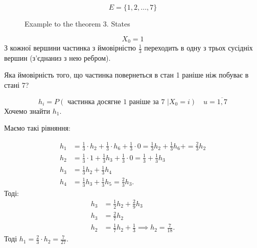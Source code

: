  \begin{example}
   \[ E = \{1,2,\ldots,7\} \] 
\begin{figure}[ht]
    \centering
    \caption{Example to the theorem 3. States}
    \label{fig:example-to-the-theorem-3-states}
\end{figure}
\[ X_0 = 1 \] 
З кожної вершини частинка з ймовірністю $\frac{1}{3}$ переходить в одну з трьох сусідніх вершин
(з'єднаниз з нею ребром).

Яка ймовірність того, що частинка повернеться в стан 1 раніше ніж побуває в стані 7?

\[ h_i = P\left( \text{ частинка досягне 1 раніше за 7 } | X_0 = i \right) \quad u = \overline{1,7} \] 
Хочемо знайти $h_1$.

Маємо такі рівняння:

\begin{align*}
  h_1 &= \frac{1}{3} \cdot h_2 + \frac{1}{3} \cdot  h_6 + \frac{1}{3} \cdot 0 =
  \frac{1}{3}h_2 + \frac{1}{3}h_6 + = \frac{2}{3}h_2 \\
  h_2 &= \frac{1}{3} \cdot 1 + \frac{1}{3}h_3 + \frac{1}{3}\cdot 0 = \frac{1}{3} + \frac{1}{3}h_3 \\
  h_3 &= \frac{1}{3}h_2 + \frac{1}{3}h_4 \\
  h_4 &= \frac{1}{3}h_3 + \frac{1}{3}h_5 = \frac{2}{3}h_3
.\end{align*}
Тоді:
\begin{align*}
  h_3 &= \frac{1}{2}h_2 + \frac{2}{9}h_3 \\
  h_3 &= \frac{2}{7}h_2 \\
  h_2 &= \frac{1}{7}h_2 + \frac{1}{3} \implies h_2 = \frac{7}{18}
.\end{align*}
Тоді $h_1 = \frac{2}{3}\cdot h_2 = \frac{7}{27}$.
 \end{example}

